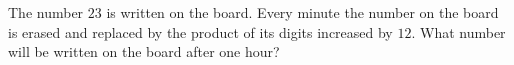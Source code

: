 The number $23$ is written on the board. Every minute the number on the board is erased and replaced by the product of its digits increased by $12$. What number will be written on the board after one hour?
